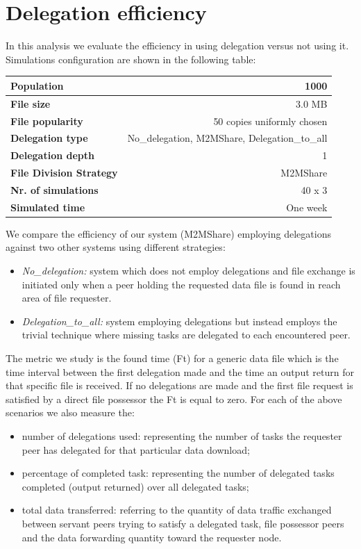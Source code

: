 \section{Delegation efficiency}
\label{analisiDelegationEfficiency}
In this analysis we evaluate the efficiency in using delegation versus not using it. Simulations configuration are shown in the following table:
\begin{table}[h]
\begin{center}
\begin{tabular}{|l|r|}
\hline
\bfseries Population & 1000 \\
\hline
\bfseries File size & 3.0 MB \\
\hline
\bfseries File popularity & 50 copies uniformly chosen \\
\hline
\bfseries Delegation type & No\_delegation, M2MShare, Delegation\_to\_all \\
\hline
\bfseries Delegation depth & 1 \\
\hline
\bfseries File Division Strategy & M2MShare \\
\hline
\bfseries Nr. of simulations & 40 x 3\\
\hline
\bfseries Simulated time & One week \\
\hline
\end{tabular}
\end{center}
\end{table}

We compare the efficiency of our system (M2MShare) employing delegations against two other systems using different strategies:
\begin{itemize}
\item \textit{No\_delegation:} system which does not employ delegations and file exchange is initiated only when a peer holding the requested data file is found in reach area of file requester.
\item \textit{Delegation\_to\_all:} system employing delegations but instead employs the trivial technique where missing tasks are delegated to each encountered peer.
\end{itemize}

The metric we study is the found time (Ft) for a generic data file which is the time interval between the first delegation made and the time an output return for that specific file is
received. If no delegations are made and the first file request is satisfied by a direct file possessor the Ft is equal to zero. For each of the above scenarios we also measure the:
\begin{itemize}
\item number of delegations used: representing the number of tasks the requester peer has delegated for that particular data download;
\item percentage of completed task: representing the number of delegated tasks completed (output returned) over all delegated tasks;
\item total data transferred: referring to the quantity of data traffic exchanged between servant peers trying to satisfy a delegated task, file possessor peers and the data forwarding quantity toward the requester node.
\end{itemize}

